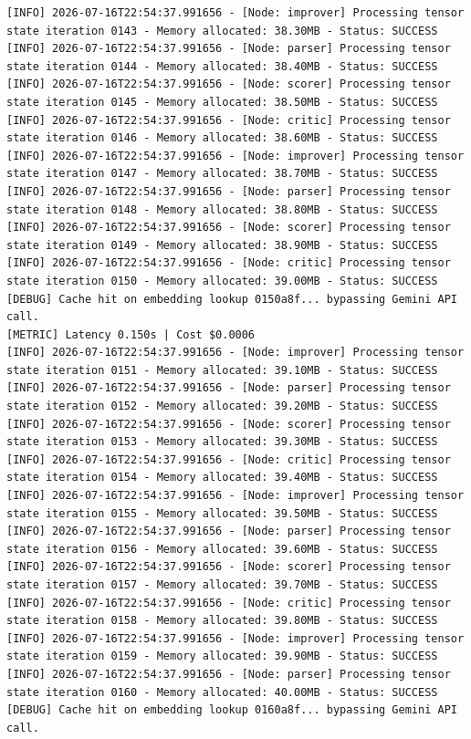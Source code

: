 \documentclass[10pt,journal,compsoc]{IEEEtran}
\begin{document}
\begin{verbatim}
[INFO] 2026-07-16T22:54:37.991656 - [Node: improver] Processing tensor state iteration 0143 - Memory allocated: 38.30MB - Status: SUCCESS
[INFO] 2026-07-16T22:54:37.991656 - [Node: parser] Processing tensor state iteration 0144 - Memory allocated: 38.40MB - Status: SUCCESS
[INFO] 2026-07-16T22:54:37.991656 - [Node: scorer] Processing tensor state iteration 0145 - Memory allocated: 38.50MB - Status: SUCCESS
[INFO] 2026-07-16T22:54:37.991656 - [Node: critic] Processing tensor state iteration 0146 - Memory allocated: 38.60MB - Status: SUCCESS
[INFO] 2026-07-16T22:54:37.991656 - [Node: improver] Processing tensor state iteration 0147 - Memory allocated: 38.70MB - Status: SUCCESS
[INFO] 2026-07-16T22:54:37.991656 - [Node: parser] Processing tensor state iteration 0148 - Memory allocated: 38.80MB - Status: SUCCESS
[INFO] 2026-07-16T22:54:37.991656 - [Node: scorer] Processing tensor state iteration 0149 - Memory allocated: 38.90MB - Status: SUCCESS
[INFO] 2026-07-16T22:54:37.991656 - [Node: critic] Processing tensor state iteration 0150 - Memory allocated: 39.00MB - Status: SUCCESS
[DEBUG] Cache hit on embedding lookup 0150a8f... bypassing Gemini API call.
[METRIC] Latency 0.150s | Cost $0.0006
[INFO] 2026-07-16T22:54:37.991656 - [Node: improver] Processing tensor state iteration 0151 - Memory allocated: 39.10MB - Status: SUCCESS
[INFO] 2026-07-16T22:54:37.991656 - [Node: parser] Processing tensor state iteration 0152 - Memory allocated: 39.20MB - Status: SUCCESS
[INFO] 2026-07-16T22:54:37.991656 - [Node: scorer] Processing tensor state iteration 0153 - Memory allocated: 39.30MB - Status: SUCCESS
[INFO] 2026-07-16T22:54:37.991656 - [Node: critic] Processing tensor state iteration 0154 - Memory allocated: 39.40MB - Status: SUCCESS
[INFO] 2026-07-16T22:54:37.991656 - [Node: improver] Processing tensor state iteration 0155 - Memory allocated: 39.50MB - Status: SUCCESS
[INFO] 2026-07-16T22:54:37.991656 - [Node: parser] Processing tensor state iteration 0156 - Memory allocated: 39.60MB - Status: SUCCESS
[INFO] 2026-07-16T22:54:37.991656 - [Node: scorer] Processing tensor state iteration 0157 - Memory allocated: 39.70MB - Status: SUCCESS
[INFO] 2026-07-16T22:54:37.991656 - [Node: critic] Processing tensor state iteration 0158 - Memory allocated: 39.80MB - Status: SUCCESS
[INFO] 2026-07-16T22:54:37.991656 - [Node: improver] Processing tensor state iteration 0159 - Memory allocated: 39.90MB - Status: SUCCESS
[INFO] 2026-07-16T22:54:37.991656 - [Node: parser] Processing tensor state iteration 0160 - Memory allocated: 40.00MB - Status: SUCCESS
[DEBUG] Cache hit on embedding lookup 0160a8f... bypassing Gemini API call.

\end{verbatim}
\end{document}
